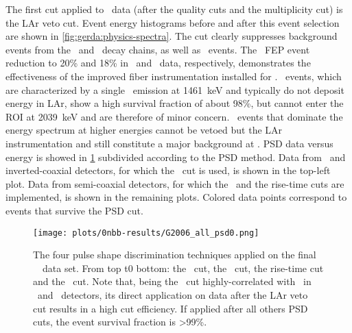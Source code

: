 The first cut applied to \phasetwo\ data (after the quality cuts and the multiplicity cut)
is the LAr veto cut.  Event energy histograms before and after this event selection are
shown in \cref{fig:gerda:physics-spectra}. The cut clearly suppresses background events from
the \Th\ and \Uh\ decay chains, as well as \kvz\ events. The \kvz\ FEP event reduction to
20\% and 18\% in \phasetwo\ and \phasetwop\ data, respectively, demonstrates the
effectiveness of the improved fiber instrumentation installed for \phasetwop. \kvn\
events, which are characterized by a single \g\ emission at 1461~keV and typically do not
deposit energy in LAr, show a high survival fraction of about 98\%, but cannot enter the
ROI at 2039~keV and are therefore of minor concern. \a\ events that dominate the energy
spectrum at higher energies cannot be vetoed but the LAr instrumentation and still
constitute a major background at \qbb.
\newpar
PSD data versus energy is showed in \cref{fig:gerda:psd-on-data} subdivided according to
the PSD method. Data from \bege\ and inverted-coaxial detectors, for which the \aoe\ cut
is used, is shown in the top-left plot. Data from semi-coaxial detectors, for which the
\annmse\ and the rise-time cuts are implemented, is shown in the remaining plots. Colored
data points correspond to events that survive the PSD cut.

\begin{figure}
  \centering
  \texttt{[image: plots/0nbb-results/G2006\_all\_psd0.png]}%
  \caption{%
    The four pulse shape discrimination techniques applied on the final \gerda\ \phasetwo\
    data set. From top t0 bottom: the \aoe\ cut, the \annmse\ cut, the
    rise-time cut and the \deltae\ cut. Note that, being the \deltae\ cut
    highly-correlated with \aoe\ in \bege\ and \icoax\ detectors, its direct application
    on data after the LAr veto cut results in a high cut efficiency. If applied after all
    others PSD cuts, the event survival fraction is >99\%.
  }\label{fig:gerda:psd-on-data}
\end{figure}

